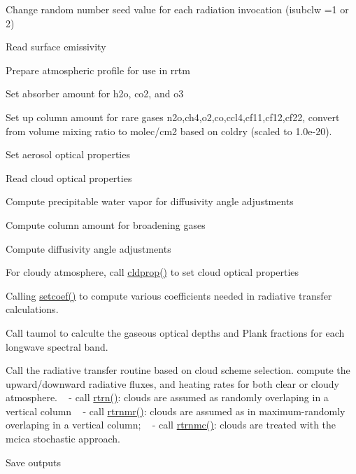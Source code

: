 \begin{DoxyEnumerate}
\item Change random number seed value for each radiation invocation (isubclw =1 or 2)
\item Read surface emissivity
\item Prepare atmospheric profile for use in rrtm
\item Set absorber amount for h2o, co2, and o3
\item Set up column amount for rare gases n2o,ch4,o2,co,ccl4,cf11,cf12,cf22, convert from volume mixing ratio to molec/cm2 based on coldry (scaled to 1.\+0e-\/20).
\item Set aerosol optical properties
\item Read cloud optical properties
\item Compute precipitable water vapor for diffusivity angle adjustments
\item Compute column amount for broadening gases
\item Compute diffusivity angle adjustments
\item For cloudy atmosphere, call \hyperlink{group__module__radlw__main_ga735598d1b11b0a090d142977a8f64f89}{cldprop()} to set cloud optical properties
\item Calling \hyperlink{group__module__radlw__main_ga503a8d3f064dfb4cd4503ae98711bab8}{setcoef()} to compute various coefficients needed in radiative transfer calculations.
\item Call taumol to calculte the gaseous optical depths and Plank fractions for each longwave spectral band.
\item Call the radiative transfer routine based on cloud scheme selection. compute the upward/downward radiative fluxes, and heating rates for both clear or cloudy atmosphere. ~\newline
 -\/ call \hyperlink{group__module__radlw__main_gaa42d8cb56a431d3693d3db44733c11e3}{rtrn()}\+: clouds are assumed as randomly overlaping in a vertical column ~\newline
 -\/ call \hyperlink{group__module__radlw__main_gab0d2454aa5b29643b52fa31abe2f97b0}{rtrnmr()}\+: clouds are assumed as in maximum-\/randomly overlaping in a vertical column; ~\newline
 -\/ call \hyperlink{group__module__radlw__main_gaf0e13eadc5dad88e144734d2c6b9fd0f}{rtrnmc()}\+: clouds are treated with the mcica stochastic approach.
\item Save outputs 
\end{DoxyEnumerate}

